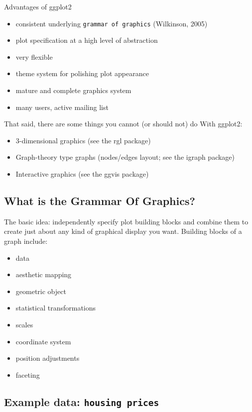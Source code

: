 \documentclass[]{book}
\providecommand{\tightlist}{%
  \setlength{\itemsep}{0pt}\setlength{\parskip}{0pt}}
\begin{document}
Advantages of ggplot2

\begin{itemize}
\tightlist
\item
  consistent underlying \texttt{grammar\ of\ graphics} (Wilkinson, 2005)
\item
  plot specification at a high level of abstraction
\item
  very flexible
\item
  theme system for polishing plot appearance
\item
  mature and complete graphics system
\item
  many users, active mailing list
\end{itemize}

That said, there are some things you cannot (or should not) do With
ggplot2:

\begin{itemize}
\tightlist
\item
  3-dimensional graphics (see the rgl package)
\item
  Graph-theory type graphs (nodes/edges layout; see the igraph package)
\item
  Interactive graphics (see the ggvis package)
\end{itemize}

\subsection{What is the Grammar Of
Graphics?}\label{what-is-the-grammar-of-graphics}

The basic idea: independently specify plot building blocks and combine
them to create just about any kind of graphical display you want.
Building blocks of a graph include:

\begin{itemize}
\tightlist
\item
  data
\item
  aesthetic mapping
\item
  geometric object
\item
  statistical transformations
\item
  scales
\item
  coordinate system
\item
  position adjustments
\item
  faceting
\end{itemize}

\subsection{\texorpdfstring{Example data:
\texttt{housing\ prices}}{Example data: housing prices}}\label{example-data-housing-prices}
\end{document}
